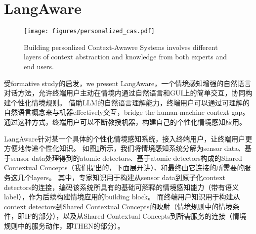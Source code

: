 



\section{LangAware}


\begin{figure}
    \centering
    \texttt{[image: figures/personalized\_cas.pdf]}
    \caption{Building personlized Context-Awawre Systems involves different layers of context abstraction and knowledge from both experts and end users.}
    \label{fig:personalized_cas}
\end{figure}


受formative study的启发，we present LangAware，一个情境感知增强的自然语言对话方法，允许终端用户主动在情境内通过自然语言和GUI上的简单交互，协同构建个性化情境规则。
借助LLM的自然语言理解能力，终端用户可以通过可理解的自然语言概念来与机器effectively交互，bridge the human-machine context gap。
通过这种方式，终端用户可以不断教授机器，构建自己的个性化情境感知应用。


\label{sec:design}

LangAware针对某一个具体的个性化情境感知系统，接入终端用户，让终端用户更方便地传递个性化知识。
如图\ref{fig:personalized_cas}所示，我们将情境感知系统分解为sensor data、基于sensor data处理得到的atomic detectors、基于atomic detectors构成的Shared Contextual Concepts（我们提出的，下面展开讲）、和最终由它连接的所需要的服务这几个layers。
其中，专家知识用于构建从sensor data到原子化context detectors的连接，编码该系统所具有的基础可解释的情境感知能力（带有语义label），作为后续构建情境应用的building block。
而终端用户知识用于构建从context detectors到Shared Contextual Concepts的映射（情境规则中的情境条件，即IF的部分），以及从Shared Contextual Concepts到所需服务的连接（情境规则中的服务动作，即THEN的部分）。

